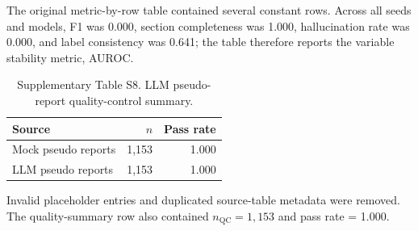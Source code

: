 \begin{table}[t]
  \centering
  \caption{Supplementary Table S7. Multi-seed AUROC stability.}
  \label{tab:s7_multiseed_stability}
  \scriptsize
  \begin{threeparttable}
  \begin{tablenotes}[flushleft]
    \footnotesize
    \item The original metric-by-row table contained several constant rows. Across all seeds and models, F1 was 0.000, section completeness was 1.000, hallucination rate was 0.000, and label consistency was 0.641; the table therefore reports the variable stability metric, AUROC.
  \end{tablenotes}
  \end{threeparttable}
\end{table}


\begin{table}[t]
  \centering
  \caption{Supplementary Table S8. LLM pseudo-report quality-control summary.}
  \label{tab:s8_llm_pseudo_report_qc}
  \small
  \begin{threeparttable}
  \begin{tabular}{lrr}
    \toprule
    \textbf{Source} & \textbf{$n$} & \textbf{Pass rate} \\
    \midrule
    Mock pseudo reports & 1,153 & 1.000 \\
    LLM pseudo reports  & 1,153 & 1.000 \\
    \bottomrule
  \end{tabular}
  \begin{tablenotes}[flushleft]
    \footnotesize
    \item Invalid placeholder entries and duplicated source-table metadata were removed. The quality-summary row also contained $n_{\mathrm{QC}}=1,153$ and pass rate = 1.000.
  \end{tablenotes}
  \end{threeparttable}
\end{table}



